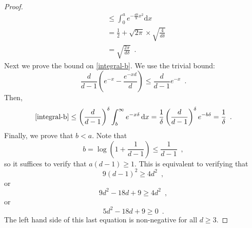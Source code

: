 \documentclass[lotsofwhite]{patmorin}
\begin{document}
\begin{proof}
\begin{align*}
        & \le \int_0^a e^{-\frac{d\delta}{8}x^2} \mathrm{d}x \\
        & = \frac{1}{2}+\sqrt{2\pi}\times\sqrt{\frac{4}{d\delta}} \\
        & = \sqrt{\frac{2\pi}{d\delta}} \enspace .
   \end{align*}
   Next we prove the bound on \eqref{integral-b}.  We use the trivial bound:
   \[
       \frac{d}{d-1}\left(e^{-x}-\frac{e^{-xd}}{d}\right) 
         \le \frac{d}{d-1}e^{-x}
       \enspace .
   \]
   Then,
   \[
      \eqref{integral-b} \le \left(\frac{d}{d-1}\right)^\delta
       \int_b^\infty e^{-x\delta} \,\mathrm{d}x 
       = \frac{1}{\delta}\left(\frac{d}{d-1}\right)^\delta e^{-b\delta}
       = \frac{1}{\delta} \enspace .
   \]
   Finally, we prove that $b<a$.  Note that 
   \[  b=\log\left(1+\frac{1}{d-1}\right)  \le \frac{1}{d-1} \enspace , \]
   so it suffices to verify that $a(d-1)\ge 1$.  This is equivalent to verifying
   that
   \[ 9(d-1)^2 \ge 4d^2 \enspace , \]
   or
   \[ 9d^2 - 18d + 9 \ge 4d^2 \enspace , \]
   or
   \[ 5d^2 - 18d + 9 \ge 0 \enspace . \]
   The left hand side of this last equation is non-negative for all $d\ge 3$.
\end{proof}
\end{document}
